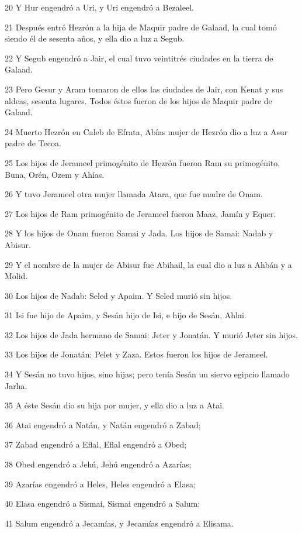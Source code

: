 \par 20 Y Hur engendró a Uri, y Uri engendró a Bezaleel.
\par 21 Después entró Hezrón a la hija de Maquir padre de Galaad, la cual tomó siendo él de sesenta años, y ella dio a luz a Segub.
\par 22 Y Segub engendró a Jair, el cual tuvo veintitrés ciudades en la tierra de Galaad.
\par 23 Pero Gesur y Aram tomaron de ellos las ciudades de Jair, con Kenat y sus aldeas, sesenta lugares. Todos éstos fueron de los hijos de Maquir padre de Galaad.
\par 24 Muerto Hezrón en Caleb de Efrata, Abías mujer de Hezrón dio a luz a Asur padre de Tecoa.
\par 25 Los hijos de Jerameel primogénito de Hezrón fueron Ram su primogénito, Buna, Orén, Ozem y Ahías.
\par 26 Y tuvo Jerameel otra mujer llamada Atara, que fue madre de Onam.
\par 27 Los hijos de Ram primogénito de Jerameel fueron Maaz, Jamín y Equer.
\par 28 Y los hijos de Onam fueron Samai y Jada. Los hijos de Samai: Nadab y Abisur.
\par 29 Y el nombre de la mujer de Abisur fue Abihail, la cual dio a luz a Ahbán y a Molid.
\par 30 Los hijos de Nadab: Seled y Apaim. Y Seled murió sin hijos.
\par 31 Isi fue hijo de Apaim, y Sesán hijo de Isi, e hijo de Sesán, Ahlai.
\par 32 Los hijos de Jada hermano de Samai: Jeter y Jonatán. Y murió Jeter sin hijos.
\par 33 Los hijos de Jonatán: Pelet y Zaza. Estos fueron los hijos de Jerameel.
\par 34 Y Sesán no tuvo hijos, sino hijas; pero tenía Sesán un siervo egipcio llamado Jarha.
\par 35 A éste Sesán dio su hija por mujer, y ella dio a luz a Atai.
\par 36 Atai engendró a Natán, y Natán engendró a Zabad;
\par 37 Zabad engendró a Eflal, Eflal engendró a Obed;
\par 38 Obed engendró a Jehú, Jehú engendró a Azarías;
\par 39 Azarías engendró a Heles, Heles engendró a Elasa;
\par 40 Elasa engendró a Sismai, Sismai engendró a Salum;
\par 41 Salum engendró a Jecamías, y Jecamías engendró a Elisama.
